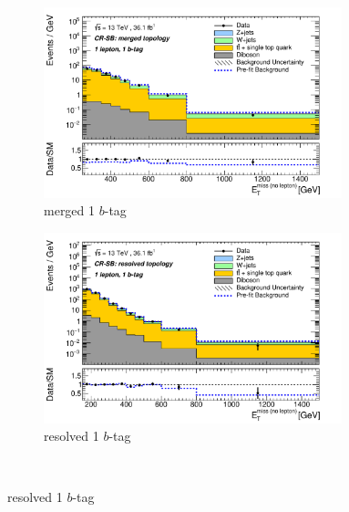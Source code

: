 \begin{figure}[htbp]
\begin{subfigure}{0.45\textwidth}
    \centering
    \includegraphics[width=0.95\textwidth]{figures/monoV/postfit/monoV_1lep_1tag_merged_massFail_met_XS.pdf}
    \caption{merged 1 \(b\)-tag}
  \end{subfigure}
    \begin{subfigure}{0.45\textwidth}
    \centering
    \includegraphics[width=0.95\textwidth]{figures/monoV/postfit/monoV_1lep_1tag_resolved_massFail_met_XS.pdf}
    \caption{resolved 1 \(b\)-tag}
  \end{subfigure} \\


\end{figure}
